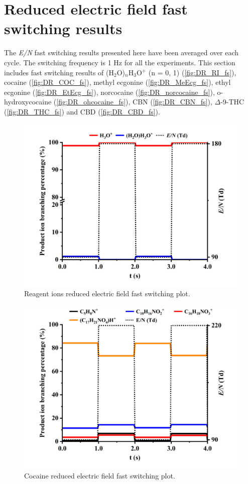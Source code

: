 \section{Reduced electric field fast switching results}
The \textit{E/N} fast switching results presented here have been averaged over each cycle.
%
The switching frequency is 1 Hz for all the experiments.
%
%
This section includes fast switching results of 
(H$_2$O)$_n$H$_3$O$^+$ (n = 0, 1) (\autoref{fig:DR_RI_fs}), 
cocaine (\autoref{fig:DR_COC_fs}),
methyl ecgonine (\autoref{fig:DR_MeEcg_fs}),
ethyl ecgonine (\autoref{fig:DR_EtEcg_fs}),
norcocaine (\autoref{fig:DR_norcocaine_fs}),
o-hydroxycocaine (\autoref{fig:DR_ohcocaine_fs}),
CBN (\autoref{fig:DR_CBN_fs}),
$\Delta$-9-THC (\autoref{fig:DR_THC_fs})
and
CBD (\autoref{fig:DR_CBD_fs}).



\begin{figure}[htb]
\centering
\includegraphics[width=0.50\linewidth]{pics/RIDPM90180Td-averaged.png}
\caption{Reagent ions reduced electric field fast switching plot.}
\label{fig:DR_RI_fs}
\end{figure}


\begin{figure}[htb]
\centering
\includegraphics[width=0.50\linewidth]{pics/other_drugs/coc-fs-90-220.png}
\caption{Cocaine reduced electric field fast switching plot.}
\label{fig:DR_COC_fs}
\end{figure}



